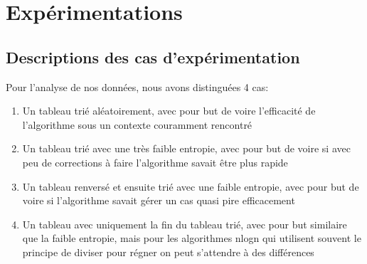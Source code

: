 \documentclass{article}
\begin{document}
\section{Expérimentations}

\subsection{Descriptions des cas d'expérimentation}
Pour l'analyse de nos données, nous avons distinguées 4 cas:
\begin{enumerate}
    \item Un tableau trié aléatoirement, avec pour but de voire l'efficacité de l'algorithme sous un contexte couramment rencontré
    \item Un tableau trié avec une très faible entropie, avec pour but de voire si avec peu de corrections à faire l'algorithme savait être plus rapide
    \item Un tableau renversé et ensuite trié avec une faible entropie, avec pour but de voire si l'algorithme savait gérer un cas quasi pire efficacement
    \item Un tableau avec uniquement la fin du tableau trié, avec pour but similaire que la faible entropie, mais pour les algorithmes nlogn qui utilisent souvent le principe de diviser pour régner on peut s'attendre à des différences
\end{enumerate}
\end{document}
